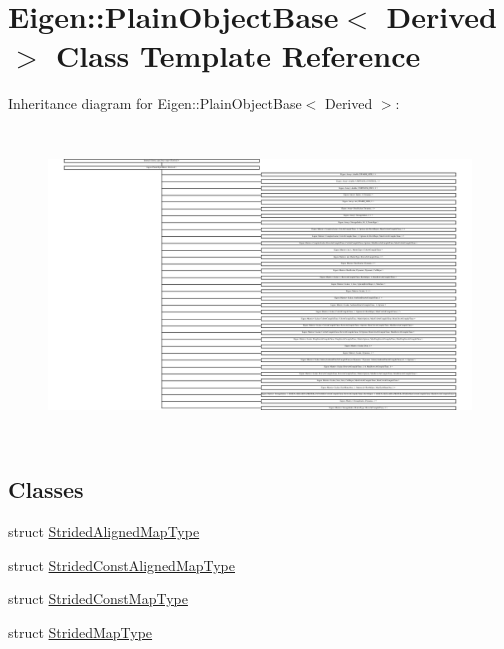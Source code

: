 \hypertarget{class_eigen_1_1_plain_object_base}{}\section{Eigen\+::Plain\+Object\+Base$<$ Derived $>$ Class Template Reference}
\label{class_eigen_1_1_plain_object_base}
Inheritance diagram for Eigen\+::Plain\+Object\+Base$<$ Derived $>$\+:\begin{figure}[H]
\begin{center}
\leavevmode
\includegraphics[height=8.288000cm]{class_eigen_1_1_plain_object_base}
\end{center}
\end{figure}
\subsection*{Classes}
\begin{DoxyCompactItemize}
\item 
struct \mbox{\hyperlink{struct_eigen_1_1_plain_object_base_1_1_strided_aligned_map_type}{Strided\+Aligned\+Map\+Type}}
\item 
struct \mbox{\hyperlink{struct_eigen_1_1_plain_object_base_1_1_strided_const_aligned_map_type}{Strided\+Const\+Aligned\+Map\+Type}}
\item 
struct \mbox{\hyperlink{struct_eigen_1_1_plain_object_base_1_1_strided_const_map_type}{Strided\+Const\+Map\+Type}}
\item 
struct \mbox{\hyperlink{struct_eigen_1_1_plain_object_base_1_1_strided_map_type}{Strided\+Map\+Type}}
\end{DoxyCompactItemize}
